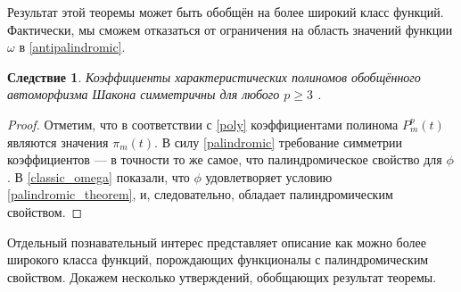 \documentclass[14pt, a4paper, russian]{report}
\newtheorem{corollary}{\indent Следствие}
\begin{document}
Результат этой теоремы может быть обобщён на более широкий класс функций. Фактически, мы сможем отказаться от ограничения на область значений функции $\omega$ в \cref{antipalindromic}.

\begin{corollary}
Коэффициенты характеристических полиномов обобщённого автоморфизма Шакона симметричны для любого $p \ge 3$ .
\end{corollary}
\begin{proof}
Отметим, что в соответствии с \cref{poly} коэффициентами полинома $P_m^p(t)$ являются значения $\pi_m(t)$. В силу \cref{palindromic} требование симметрии коэффициентов --- в точности то же самое, что палиндромическое свойство для $\phi$. В \cref{classic_omega} показали, что $\phi$ удовлетворяет условию \cref{palindromic_theorem}, и, следовательно, обладает палиндромическим свойством.
\end{proof}

Отдельный познавательный интерес представляет описание как можно более широкого класса функций, порождающих функционалы с палиндромическим свойством. Докажем несколько утверждений, обобщающих результат теоремы.
\end{document}
